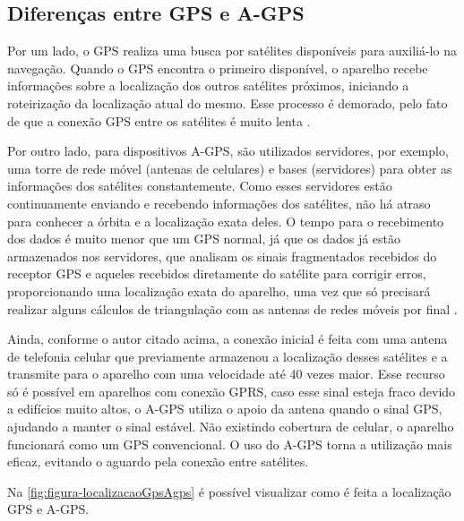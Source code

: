 \subsection{Diferenças entre GPS e A-GPS}

Por um lado, o GPS realiza uma busca por satélites disponíveis para auxiliá-lo na navegação. Quando o GPS encontra o primeiro disponível, o aparelho recebe informações sobre a localização dos outros satélites próximos, iniciando a roteirização da localização atual do mesmo. Esse processo é demorado, pelo fato de que a conexão GPS entre os satélites é muito lenta \cite{oficinanetagps:2018}.

Por outro lado, para dispositivos A-GPS, são utilizados servidores, por exemplo, uma torre de rede móvel (antenas de celulares) e bases (servidores) para obter as informações dos satélites constantemente. Como esses servidores estão continuamente enviando e recebendo informações dos satélites, não há atraso para conhecer a órbita e a localização exata deles. O tempo para o recebimento dos dados é muito menor que um GPS normal, já que os dados já estão armazenados nos servidores, que analisam os sinais fragmentados recebidos do receptor GPS e aqueles recebidos diretamente do satélite para corrigir erros, proporcionando uma localização exata do aparelho, uma vez que só precisará realizar alguns cálculos de triangulação com as antenas de redes móveis por final \cite{oficinanetagps:2018}.

Ainda, conforme o autor citado acima, a conexão inicial é feita com uma antena de telefonia celular que previamente armazenou a localização desses satélites e a transmite para o aparelho com uma velocidade até 40 vezes maior. Esse recurso só é possível em aparelhos com conexão GPRS, caso esse sinal esteja fraco devido a edifícios muito altos, o A-GPS utiliza o apoio da antena quando o sinal GPS, ajudando a manter o sinal estável. Não existindo cobertura de celular, o aparelho funcionará como um GPS convencional. O uso do A-GPS torna a utilização mais eficaz, evitando o aguardo pela conexão entre satélites. 

Na \autoref{fig:figura-localizacaoGpsAgps} é possível visualizar como é feita a localização GPS e A-GPS.


